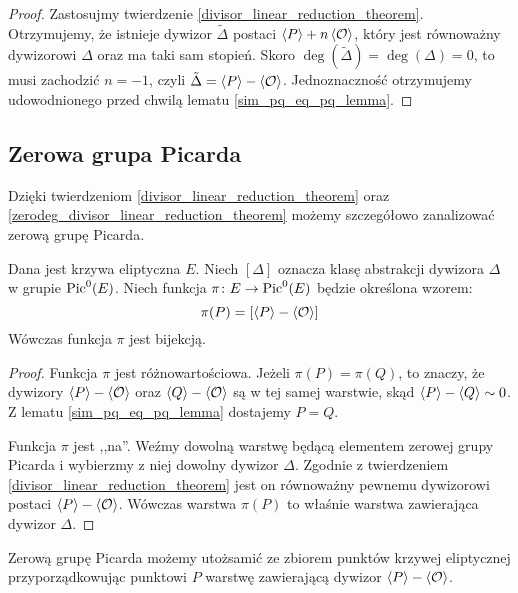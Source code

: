 \begin{proof}
Zastosujmy twierdzenie \ref{divisor_linear_reduction_theorem}.
Otrzymujemy, że istnieje dywizor $\tilde{\Delta}$
postaci $\left\langle P\right\rangle + n\left\langle\mathcal{O}\right\rangle$,
który jest równoważny dywizorowi $\Delta$ oraz ma taki sam stopień.
Skoro $\deg(\tilde{\Delta}) = \deg(\Delta) = 0$,
to musi zachodzić $n = -1$, czyli $\tilde{\Delta} = \left\langle P\right\rangle - \left\langle\mathcal{O}\right\rangle$.
Jednoznaczność otrzymujemy udowodnionego przed chwilą lematu
\ref{sim_pq_eq_pq_lemma}.
\end{proof}

\subsection*{Zerowa grupa Picarda}

Dzięki twierdzeniom \ref{divisor_linear_reduction_theorem}
oraz \ref{zerodeg_divisor_linear_reduction_theorem}
możemy szczegółowo zanalizować zerową grupę Picarda.

\begin{theorem}\label{piczero_curvepts_bijection_theorem}
Dana jest krzywa eliptyczna $E$.
Niech $[\Delta]$ oznacza klasę abstrakcji dywizora $\Delta$
w grupie $\operatorname{Pic}^0(E)$.
Niech funkcja $\pi\colon E \to \operatorname{Pic}^0(E)$ będzie określona wzorem:
\begin{equation}\label{piczero_bijection_eqn}
\pi(P) = [\left\langle P\right\rangle - \left\langle\mathcal{O}\right\rangle]
\end{equation}
Wówczas funkcja $\pi$ jest bijekcją.
\end{theorem}

\begin{proof}
Funkcja $\pi$ jest różnowartościowa. Jeżeli $\pi(P) = \pi(Q)$,
to znaczy, że dywizory $\left\langle P\right\rangle - \left\langle\mathcal{O}\right\rangle$
oraz $\left\langle Q\right\rangle - \left\langle\mathcal{O}\right\rangle$ są w tej samej warstwie,
skąd $\left\langle P\right\rangle - \left\langle Q\right\rangle \sim 0$.
Z lematu \ref{sim_pq_eq_pq_lemma} dostajemy $P = Q$.

Funkcja $\pi$ jest ,,na''. Weźmy dowolną warstwę będącą elementem
zerowej grupy Picarda i wybierzmy z niej dowolny dywizor $\Delta$.
Zgodnie z twierdzeniem \ref{divisor_linear_reduction_theorem}
jest on równoważny pewnemu dywizorowi postaci $\left\langle P\right\rangle - \left\langle\mathcal{O}\right\rangle$.
Wówczas warstwa $\pi(P)$ to właśnie warstwa zawierająca dywizor $\Delta$.
\end{proof}

\begin{corollary}\label{piczero_representants_coro}
Zerową grupę Picarda możemy utożsamić
ze zbiorem punktów krzywej eliptycznej
przyporządkowując punktowi $P$
warstwę zawierającą dywizor $\left\langle P\right\rangle - \left\langle\mathcal{O}\right\rangle$.
\end{corollary}

